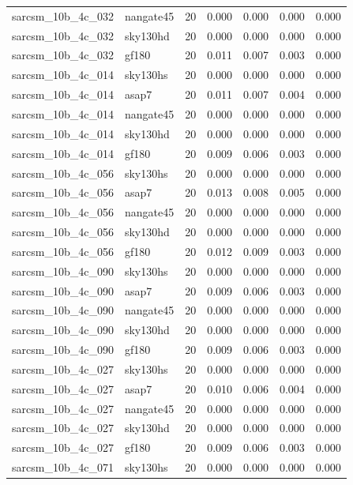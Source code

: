 \begin{tabular}{llrrrrr}
sarcsm\_10b\_4c\_032 & nangate45 & 20 & 0.000 & 0.000 & 0.000 & 0.000 \\
sarcsm\_10b\_4c\_032 & sky130hd & 20 & 0.000 & 0.000 & 0.000 & 0.000 \\
sarcsm\_10b\_4c\_032 & gf180 & 20 & 0.011 & 0.007 & 0.003 & 0.000 \\
sarcsm\_10b\_4c\_014 & sky130hs & 20 & 0.000 & 0.000 & 0.000 & 0.000 \\
sarcsm\_10b\_4c\_014 & asap7 & 20 & 0.011 & 0.007 & 0.004 & 0.000 \\
sarcsm\_10b\_4c\_014 & nangate45 & 20 & 0.000 & 0.000 & 0.000 & 0.000 \\
sarcsm\_10b\_4c\_014 & sky130hd & 20 & 0.000 & 0.000 & 0.000 & 0.000 \\
sarcsm\_10b\_4c\_014 & gf180 & 20 & 0.009 & 0.006 & 0.003 & 0.000 \\
sarcsm\_10b\_4c\_056 & sky130hs & 20 & 0.000 & 0.000 & 0.000 & 0.000 \\
sarcsm\_10b\_4c\_056 & asap7 & 20 & 0.013 & 0.008 & 0.005 & 0.000 \\
sarcsm\_10b\_4c\_056 & nangate45 & 20 & 0.000 & 0.000 & 0.000 & 0.000 \\
sarcsm\_10b\_4c\_056 & sky130hd & 20 & 0.000 & 0.000 & 0.000 & 0.000 \\
sarcsm\_10b\_4c\_056 & gf180 & 20 & 0.012 & 0.009 & 0.003 & 0.000 \\
sarcsm\_10b\_4c\_090 & sky130hs & 20 & 0.000 & 0.000 & 0.000 & 0.000 \\
sarcsm\_10b\_4c\_090 & asap7 & 20 & 0.009 & 0.006 & 0.003 & 0.000 \\
sarcsm\_10b\_4c\_090 & nangate45 & 20 & 0.000 & 0.000 & 0.000 & 0.000 \\
sarcsm\_10b\_4c\_090 & sky130hd & 20 & 0.000 & 0.000 & 0.000 & 0.000 \\
sarcsm\_10b\_4c\_090 & gf180 & 20 & 0.009 & 0.006 & 0.003 & 0.000 \\
sarcsm\_10b\_4c\_027 & sky130hs & 20 & 0.000 & 0.000 & 0.000 & 0.000 \\
sarcsm\_10b\_4c\_027 & asap7 & 20 & 0.010 & 0.006 & 0.004 & 0.000 \\
sarcsm\_10b\_4c\_027 & nangate45 & 20 & 0.000 & 0.000 & 0.000 & 0.000 \\
sarcsm\_10b\_4c\_027 & sky130hd & 20 & 0.000 & 0.000 & 0.000 & 0.000 \\
sarcsm\_10b\_4c\_027 & gf180 & 20 & 0.009 & 0.006 & 0.003 & 0.000 \\
sarcsm\_10b\_4c\_071 & sky130hs & 20 & 0.000 & 0.000 & 0.000 & 0.000 \\

\end{tabular}
